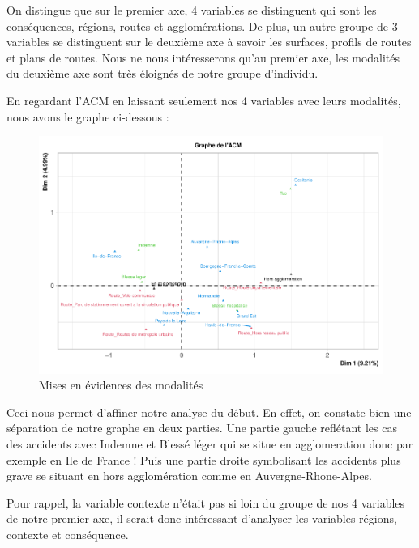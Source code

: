 \documentclass[french,]{compterendu}
\theoremstyle{urcastyle}
\theoremstyle{remark}
\begin{document}
On distingue que sur le premier axe, 4 variables se distinguent qui sont les conséquences, régions, routes et agglomérations. De plus, un autre groupe de 3 variables se distinguent sur le deuxième axe à savoir les surfaces, profils de routes et plans de routes.
Nous ne nous intéresserons qu'au premier axe, les modalités du deuxième axe sont très éloignés de notre groupe d'individu.

En regardant l'ACM en laissant seulement nos 4 variables avec leurs modalités, nous avons le graphe ci-dessous :

\begin{figure}[H]

{\centering \includegraphics[width=0.9\linewidth]{Rapport_ADD_LEO-GABET_files/figure-latex/acm1modagraphe-1} 

}

\caption{Mises en évidences des modalités}\label{fig:acm1modagraphe}
\end{figure}

Ceci nous permet d'affiner notre analyse du début. En effet, on constate bien une séparation de notre graphe en deux parties. Une partie gauche reflétant les cas des accidents avec Indemne et Blessé léger qui se situe en agglomeration donc par exemple en Ile de France ! Puis une partie droite symbolisant les accidents plus grave se situant en hors agglomération comme en Auvergne-Rhone-Alpes.

Pour rappel, la variable contexte n'était pas si loin du groupe de nos 4 variables de notre premier axe, il serait donc intéressant d'analyser les variables régions, contexte et conséquence.
\end{document}
